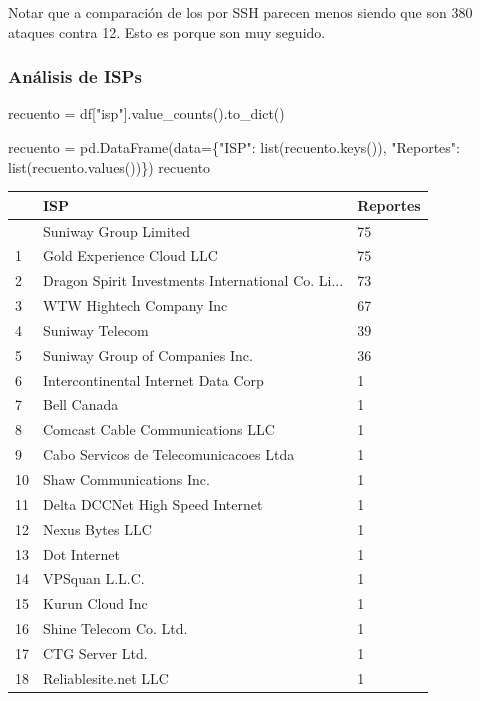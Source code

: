 \documentclass[
  letterpaper,
  DIV=11,
  numbers=noendperiod]{scrartcl}
\newenvironment{Shaded}{\begin{snugshade}}{\end{snugshade}}
\newcommand{\BuiltInTok}[1]{\textcolor[rgb]{0.00,0.23,0.31}{#1}}
\newcommand{\NormalTok}[1]{\textcolor[rgb]{0.00,0.23,0.31}{#1}}
\newcommand{\OperatorTok}[1]{\textcolor[rgb]{0.37,0.37,0.37}{#1}}
\newcommand{\StringTok}[1]{\textcolor[rgb]{0.13,0.47,0.30}{#1}}
\begin{document}
Notar que a comparación de los por SSH parecen menos siendo que son 380
ataques contra 12. Esto es porque son muy seguido.

\hypertarget{anuxe1lisis-de-isps-1}{%
\subsubsection{Análisis de ISPs}\label{anuxe1lisis-de-isps-1}}

\begin{Shaded}
\begin{Highlighting}[]
\NormalTok{recuento }\OperatorTok{=}\NormalTok{ df[}\StringTok{"isp"}\NormalTok{].value\_counts().to\_dict()}

\NormalTok{recuento }\OperatorTok{=}\NormalTok{ pd.DataFrame(data}\OperatorTok{=}\NormalTok{\{}\StringTok{"ISP"}\NormalTok{: }\BuiltInTok{list}\NormalTok{(recuento.keys()), }\StringTok{"Reportes"}\NormalTok{: }\BuiltInTok{list}\NormalTok{(recuento.values())\})}
\NormalTok{recuento}
\end{Highlighting}
\end{Shaded}

\begin{longtable}[]{@{}lll@{}}
\toprule\noalign{}
& ISP & Reportes \\
\midrule\noalign{}
\endhead
\bottomrule\noalign{}
\endlastfoot
0 & Suniway Group Limited & 75 \\
1 & Gold Experience Cloud LLC & 75 \\
2 & Dragon Spirit Investments International Co. Li... & 73 \\
3 & WTW Hightech Company Inc & 67 \\
4 & Suniway Telecom & 39 \\
5 & Suniway Group of Companies Inc. & 36 \\
6 & Intercontinental Internet Data Corp & 1 \\
7 & Bell Canada & 1 \\
8 & Comcast Cable Communications LLC & 1 \\
9 & Cabo Servicos de Telecomunicacoes Ltda & 1 \\
10 & Shaw Communications Inc. & 1 \\
11 & Delta DCCNet High Speed Internet & 1 \\
12 & Nexus Bytes LLC & 1 \\
13 & Dot Internet & 1 \\
14 & VPSquan L.L.C. & 1 \\
15 & Kurun Cloud Inc & 1 \\
16 & Shine Telecom Co. Ltd. & 1 \\
17 & CTG Server Ltd. & 1 \\
18 & Reliablesite.net LLC & 1 \\
\end{longtable}
\end{document}
